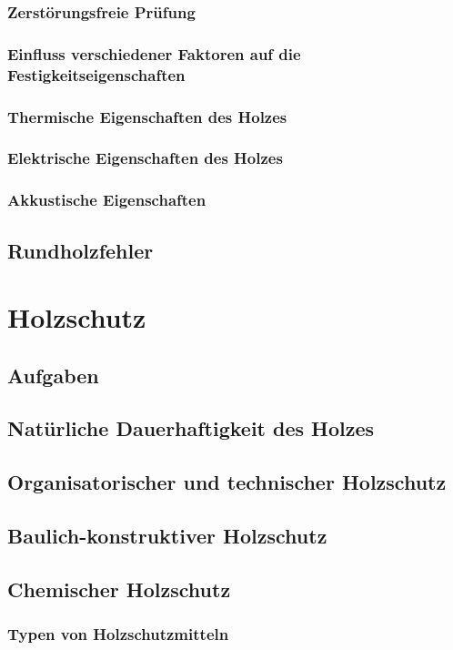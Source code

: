 \documentclass{article}
\begin{document}
\subsubsection{Zerstörungsfreie Prüfung}
\subsubsection{Einfluss verschiedener Faktoren auf die Festigkeitseigenschaften}
\subsubsection{Thermische Eigenschaften des Holzes}
\subsubsection{Elektrische Eigenschaften des Holzes}
\subsubsection{Akkustische Eigenschaften}
\subsection{Rundholzfehler}
\section{Holzschutz}
\subsection{Aufgaben}
\subsection{Natürliche Dauerhaftigkeit des Holzes}
\subsection{Organisatorischer und technischer Holzschutz}
\subsection{Baulich-konstruktiver Holzschutz}
\subsection{Chemischer Holzschutz}
\subsubsection{Typen von Holzschutzmitteln}
\end{document}
